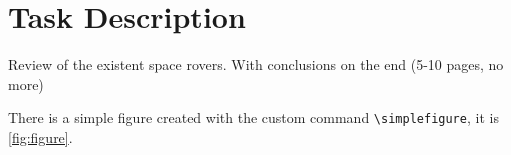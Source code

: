\section{Task Description}

Review of the existent space rovers. With conclusions on the end (5-10 pages,
no more)

There is a simple figure created with the custom command
\texttt{\textbackslash simplefigure}, it is \cref{fig:figure}.

